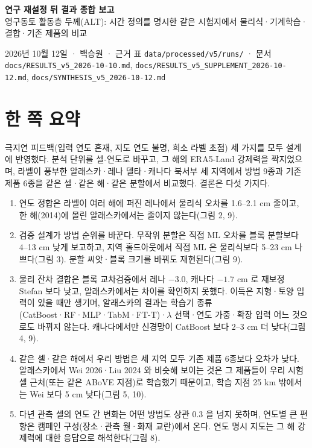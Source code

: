 \documentclass[10pt]{article}
\begin{document}
{\headfont\cjkhead\LARGE\bfseries 연구 재설정 뒤 결과 종합 보고}\\[0.3em]
{\large 영구동토 활동층 두께(ALT): 시간 정의를 명시한 같은 시험지에서 물리식·기계학습·결합·기존 제품의 비교}\\[0.2em]
\parbox{\textwidth}{\raggedright 2026년 10월 12일 · 백승원 · 근거 표 \texttt{data/processed/v5/runs/} · 문서 \texttt{docs/RESULTS\_v5\_2026-10-10.md}, \texttt{docs/RESULTS\_v5\_SUPPLEMENT\_2026-10-12.md}, \texttt{docs/SYNTHESIS\_v5\_2026-10-12.md}}

\section{한 쪽 요약}
극지연 피드백(입력 연도 혼재, 지도 연도 불명, 희소 라벨 초점) 세 가지를 모두 설계에 반영했다. 분석 단위를 셀-연도로 바꾸고, 그 해의 ERA5-Land 강제력을 짝지었으며, 라벨이 풍부한 알래스카·레나 델타·캐나다 북서부 세 지역에서 방법 9종과 기존 제품 6종을 같은 셀·같은 해·같은 분할에서 비교했다. 결론은 다섯 가지다.
\begin{enumerate}[leftmargin=1.4em,itemsep=0.1em]
\item 연도 정합은 라벨이 여러 해에 퍼진 레나에서 물리식 오차를 1.6--2.1 cm 줄이고, 한 해(2014)에 몰린 알래스카에서는 줄이지 않는다(그림 2, 9).
\item 검증 설계가 방법 순위를 바꾼다. 무작위 분할은 직접 ML 오차를 블록 분할보다 4--13 cm 낮게 보고하고, 지역 홀드아웃에서 직접 ML 은 물리식보다 5--23 cm 나쁘다(그림 3). 분할 씨앗·블록 크기를 바꿔도 재현된다(그림 9).
\item 물리 잔차 결합은 블록 교차검증에서 레나 $-3.0$, 캐나다 $-1.7$ cm 로 재보정 Stefan 보다 낮고, 알래스카에서는 차이를 확인하지 못했다. 이득은 지형·토양 입력이 있을 때만 생기며, 알래스카의 결과는 학습기 종류(CatBoost·RF·MLP·TabM·FT-T)·$\lambda$ 선택·연도 가중·확장 입력 어느 것으로도 바뀌지 않는다. 캐나다에서만 신경망이 CatBoost 보다 2--3 cm 더 낮다(그림 4, 9).
\item 같은 셀·같은 해에서 우리 방법은 세 지역 모두 기존 제품 6종보다 오차가 낮다. 알래스카에서 Wei 2026·Liu 2024 와 비슷해 보이는 것은 그 제품들이 우리 시험 셀 근처(또는 같은 ABoVE 지점)로 학습했기 때문이고, 학습 지점 25 km 밖에서는 Wei 보다 5 cm 낮다(그림 5, 10).
\item 다년 관측 셀의 연도 간 변화는 어떤 방법도 상관 0.3 을 넘지 못하며, 연도별 큰 편향은 캠페인 구성(장소·관측 월·화재 교란)에서 온다. 연도 명시 지도는 그 해 강제력에 대한 응답으로 해석한다(그림 8).
\end{enumerate}
\end{document}
